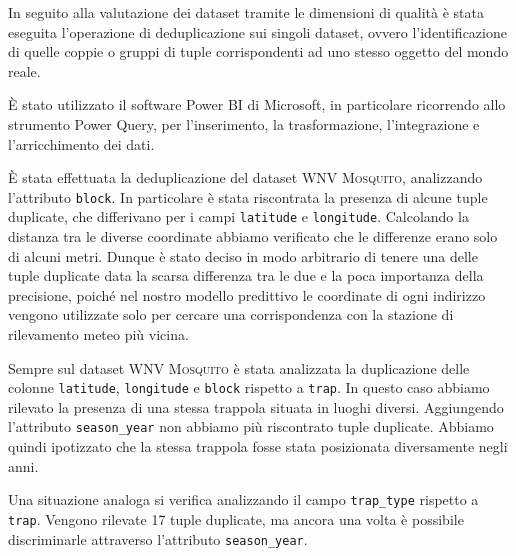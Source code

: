 In seguito alla valutazione dei dataset tramite le dimensioni di qualità è 
stata eseguita l'operazione di deduplicazione sui singoli dataset, ovvero 
l'identificazione di quelle coppie o gruppi di tuple corrispondenti ad uno 
stesso oggetto del mondo reale.

È stato utilizzato il software Power BI di Microsoft, 
in particolare ricorrendo allo strumento Power Query, per l'inserimento, la 
trasformazione, l'integrazione e l'arricchimento dei dati.

È stata effettuata la deduplicazione del dataset \textsc{WNV Mosquito}, 
analizzando l'attributo \texttt{block}. In particolare è stata riscontrata 
la presenza di alcune tuple duplicate, che differivano per i campi 
\texttt{latitude} e \texttt{longitude}. Calcolando la distanza tra le diverse 
coordinate abbiamo verificato che le differenze erano solo di alcuni metri.
Dunque è stato deciso in modo arbitrario di tenere una delle tuple duplicate 
data la scarsa differenza tra le due e la poca importanza della precisione, 
poiché nel nostro modello predittivo le coordinate di ogni indirizzo vengono 
utilizzate solo per cercare una corrispondenza con la stazione di rilevamento 
meteo più vicina.

Sempre sul dataset \textsc{WNV Mosquito} è stata analizzata la duplicazione 
delle colonne \texttt{latitude}, \texttt{longitude} e \texttt{block} rispetto a 
\texttt{trap}. In questo caso abbiamo rilevato la presenza di una stessa 
trappola situata in luoghi diversi. Aggiungendo l'attributo 
\texttt{season\_year} non abbiamo più riscontrato tuple duplicate. Abbiamo 
quindi ipotizzato che la stessa trappola fosse stata posizionata diversamente 
negli anni.

Una situazione analoga si verifica analizzando il campo \texttt{trap\_type} 
rispetto a \texttt{trap}. Vengono rilevate 17 tuple duplicate, ma ancora una 
volta è possibile discriminarle attraverso l'attributo \texttt{season\_year}.

